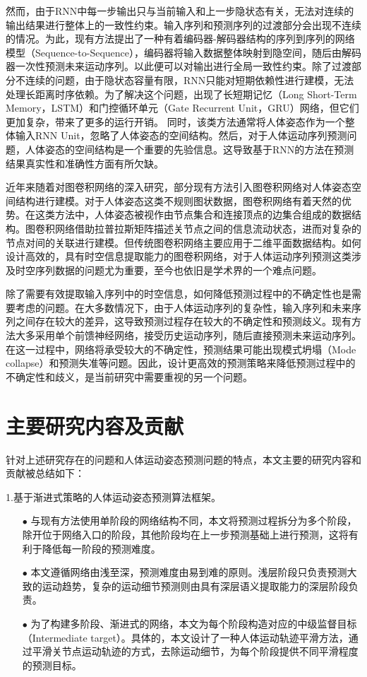 然而，由于RNN中每一步输出只与当前输入和上一步隐状态有关，无法对连续的输出结果进行整体上的一致性约束。输入序列和预测序列的过渡部分会出现不连续的情况。为此，现有方法提出了一种有着编码器-解码器结构的序列到序列的网络模型（Sequence-to-Sequence），编码器将输入数据整体映射到隐空间，随后由解码器一次性预测未来运动序列。以此便可以对输出进行全局一致性约束。除了过渡部分不连续的问题，由于隐状态容量有限，RNN只能对短期依赖性进行建模，无法处理长距离时序依赖。为了解决这个问题，出现了长短期记忆\parencite{shi2015convolutional}（Long Short-Term Memory，LSTM）和门控循环单元\parencite{cho2014learning}（Gate Recurrent Unit，GRU）网络，但它们更加复杂，带来了更多的运行开销。
同时，该类方法通常将人体姿态作为一个整体输入RNN Unit，忽略了人体姿态的空间结构。然后，对于人体运动序列预测问题，人体姿态的空间结构是一个重要的先验信息。这导致基于RNN的方法在预测结果真实性和准确性方面有所欠缺。

近年来随着对图卷积网络\parencite{kipf2016semi}的深入研究，部分现有方法引入图卷积网络对人体姿态空间结构进行建模。对于人体姿态这类不规则图状数据，图卷积网络有着天然的优势。在这类方法中，人体姿态被视作由节点集合和连接顶点的边集合组成的数据结构。图卷积网络借助拉普拉斯矩阵描述关节点之间的信息流动状态，进而对复杂的节点对间的关联进行建模。但传统图卷积网络主要应用于二维平面数据结构。如何设计高效的，具有时空信息提取能力的图卷积网络，对于人体运动序列预测这类涉及时空序列数据的问题尤为重要，至今也依旧是学术界的一个难点问题。

除了需要有效提取输入序列中的时空信息，如何降低预测过程中的不确定性也是需要考虑的问题。在大多数情况下，由于人体运动序列的复杂性，输入序列和未来序列之间存在较大的差异，这导致预测过程存在较大的不确定性和预测歧义。现有方法大多采用单个前馈神经网络，接受历史运动序列，随后直接预测未来运动序列。在这一过程中，网络将承受较大的不确定性，预测结果可能出现模式坍塌（Mode collapse）和预测失准等问题。因此，设计更高效的预测策略来降低预测过程中的不确定性和歧义，是当前研究中需要重视的另一个问题。

\section{主要研究内容及贡献}
针对上述研究存在的问题和人体运动姿态预测问题的特点，本文主要的研究内容和贡献被总结如下：

1.基于渐进式策略的人体运动姿态预测算法框架。
\begin{enumerate}[topsep = 0 pt, itemsep= 0 pt, parsep=0pt, partopsep=0pt, leftmargin=44pt, itemindent=0pt, labelsep=6pt]
	\item[$\bullet$] 与现有方法使用单阶段的网络结构不同，本文将预测过程拆分为多个阶段，除开位于网络入口的阶段，其他阶段均在上一步预测基础上进行预测，这将有利于降低每一阶段的预测难度。
	\item[$\bullet$] 本文遵循网络由浅至深，预测难度由易到难的原则。浅层阶段只负责预测大致的运动趋势，复杂的运动细节预测则由具有深层语义提取能力的深层阶段负责。
	\item[$\bullet$] 为了构建多阶段、渐进式的网络，本文为每个阶段构造对应的中级监督目标（Intermediate target）。具体的，本文设计了一种人体运动轨迹平滑方法，通过平滑关节点运动轨迹的方式，去除运动细节，为每个阶段提供不同平滑程度的预测目标。
\end{enumerate}


